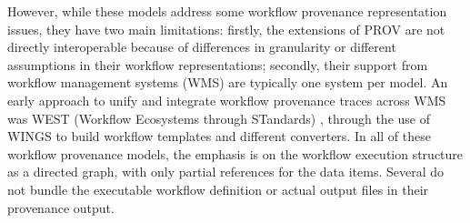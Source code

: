 \documentclass[10pt,letterpaper]{article}
\begin{document}
However, while these models address some workflow provenance representation issues, they have two main limitations: firstly, the extensions of PROV are not directly interoperable because of differences in granularity or different assumptions in their workflow representations; secondly, their support from workflow management systems (WMS) are typically one system per model.  An early approach to unify and integrate workflow provenance traces across WMS was WEST (Workflow Ecosystems through STandards) \cite{Garijo 2014}, through the use of WINGS \cite{Gil 2011} to build workflow templates and different converters. In all of these workflow provenance models, the emphasis is on the workflow execution structure as a directed graph, with only partial references for the data items. Several do not bundle the executable workflow definition or actual output files in their provenance output.
\end{document}
